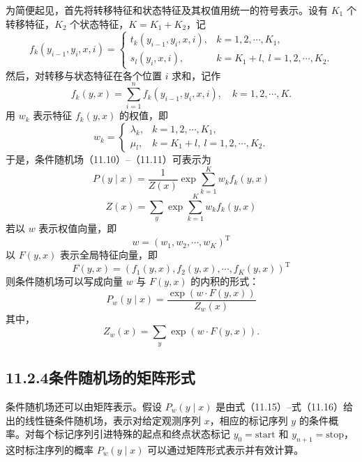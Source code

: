 \documentclass[UTF8,12pt,a4paper,fontset=fandol]{ctexart}
\begin{document}
为简便起见，首先将转移特征和状态特征及其权值用统一的符号表示。设有 $K_1$ 个转移特征，$K_2$ 个状态特征，$K=K_1+K_2$，记
\begin{equation}
f_k(y_{i-1},y_i,x,i)=
\begin{cases}
t_k(y_{i-1},y_i,x,i), & k=1,2,\cdots,K_1,\\
s_l(y_i,x,i), & k=K_1+l,\ l=1,2,\cdots,K_2.
\end{cases}
\tag{11.12}
\end{equation}
然后，对转移与状态特征在各个位置 $i$ 求和，记作
\begin{equation}
f_k(y,x)=\sum_{i=1}^{n}f_k(y_{i-1},y_i,x,i),\quad k=1,2,\cdots,K.
\tag{11.13}
\end{equation}
用 $w_k$ 表示特征 $f_k(y,x)$ 的权值，即
\begin{equation}
w_k=
\begin{cases}
\lambda_k, & k=1,2,\cdots,K_1,\\
\mu_l, & k=K_1+l,\ l=1,2,\cdots,K_2.
\end{cases}
\tag{11.14}
\end{equation}
于是，条件随机场（11.10）--（11.11）可表示为
\begin{equation}
P(y\mid x)=\frac{1}{Z(x)}\exp\sum_{k=1}^{K}w_k f_k(y,x)
\tag{11.15}
\end{equation}
\begin{equation}
Z(x)=\sum_y\exp\sum_{k=1}^{K}w_k f_k(y,x)
\tag{11.16}
\end{equation}
若以 $w$ 表示权值向量，即
\begin{equation}
w=(w_1,w_2,\cdots,w_K)^{\mathrm T}
\tag{11.17}
\end{equation}
以 $F(y,x)$ 表示全局特征向量，即
\begin{equation}
F(y,x)=(f_1(y,x),f_2(y,x),\cdots,f_K(y,x))^{\mathrm T}
\tag{11.18}
\end{equation}
则条件随机场可以写成向量 $w$ 与 $F(y,x)$ 的内积的形式：
\begin{equation}
P_w(y\mid x)=\frac{\exp(w\cdot F(y,x))}{Z_w(x)}
\tag{11.19}
\end{equation}
其中，
\begin{equation}
Z_w(x)=\sum_y\exp(w\cdot F(y,x)).
\tag{11.20}
\end{equation}

\subsection*{11.2.4\quad 条件随机场的矩阵形式}

条件随机场还可以由矩阵表示。假设 $P_w(y\mid x)$ 是由式（11.15）--式（11.16）给出的线性链条件随机场，表示对给定观测序列 $x$，相应的标记序列 $y$ 的条件概率。对每个标记序列引进特殊的起点和终点状态标记 $y_0=\text{start}$ 和 $y_{n+1}=\text{stop}$，这时标注序列的概率 $P_w(y\mid x)$ 可以通过矩阵形式表示并有效计算。
\end{document}
